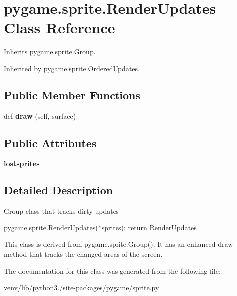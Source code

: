 \hypertarget{classpygame_1_1sprite_1_1_render_updates}{}\section{pygame.\+sprite.\+Render\+Updates Class Reference}
\label{classpygame_1_1sprite_1_1_render_updates}


Inherits \hyperlink{classpygame_1_1sprite_1_1_group}{pygame.\+sprite.\+Group}.



Inherited by \hyperlink{classpygame_1_1sprite_1_1_ordered_updates}{pygame.\+sprite.\+Ordered\+Updates}.

\subsection*{Public Member Functions}
\begin{DoxyCompactItemize}
\item 
\mbox{\label{classpygame_1_1sprite_1_1_render_updates_a61c1d3d3f157fc05d9715cc326e0f8b7}} 
def {\bfseries draw} (self, surface)
\end{DoxyCompactItemize}
\subsection*{Public Attributes}
\begin{DoxyCompactItemize}
\item 
\mbox{\label{classpygame_1_1sprite_1_1_render_updates_af3408070d1e19a023e24e3c7a5cc7259}} 
{\bfseries lostsprites}
\end{DoxyCompactItemize}


\subsection{Detailed Description}
\begin{DoxyVerb}Group class that tracks dirty updates

pygame.sprite.RenderUpdates(*sprites): return RenderUpdates

This class is derived from pygame.sprite.Group(). It has an enhanced draw
method that tracks the changed areas of the screen.\end{DoxyVerb}
 

The documentation for this class was generated from the following file\+:\begin{DoxyCompactItemize}
\item 
venv/lib/python3./site-\/packages/pygame/sprite.\+py\end{DoxyCompactItemize}
